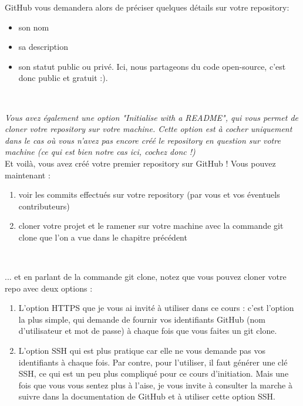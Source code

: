 GitHub vous demandera alors de préciser quelques détails sur votre repository:
\begin{itemize}
\item son nom
\item sa description
\item son statut public ou privé. Ici, nous partageons du code open-source, c'est donc public et gratuit :).
\end{itemize}

\

\textit{Vous avez également une option "Initialise with a README", qui vous permet de cloner votre repository sur votre machine. Cette option est à cocher uniquement dans le cas où vous n'avez pas encore créé le repository en question sur votre machine (ce qui est bien notre cas ici, cochez donc !)}\\

Et voilà, vous avez créé votre premier repository sur GitHub ! Vous pouvez maintenant :
\begin{enumerate}
\item voir les commits effectués sur votre repository (par vous et vos éventuels contributeurs) 
\item cloner votre projet et le ramener sur votre machine avec la commande git clone que l'on a vue dans le chapitre précédent
\end{enumerate}

\

... et en parlant de la commande git clone, notez que vous pouvez cloner votre repo avec deux options : 
\begin{enumerate}
\item L'option HTTPS que je vous ai  invité à utiliser dans ce cours : c'est l'option la plus simple, qui demande de fournir vos identifiants GitHub (nom d'utilisateur et mot de passe) à chaque fois que vous faites un git clone. 
\item L'option SSH qui est plus pratique car elle ne vous demande pas vos identifiants à chaque fois. Par contre, pour l'utiliser, il faut générer une clé SSH, ce qui est un peu plus compliqué pour ce cours d'initiation. Mais une fois que vous vous sentez plus à l'aise, je vous invite à consulter la marche à suivre dans la documentation de GitHub et à utiliser cette option SSH.  
\end{enumerate}

